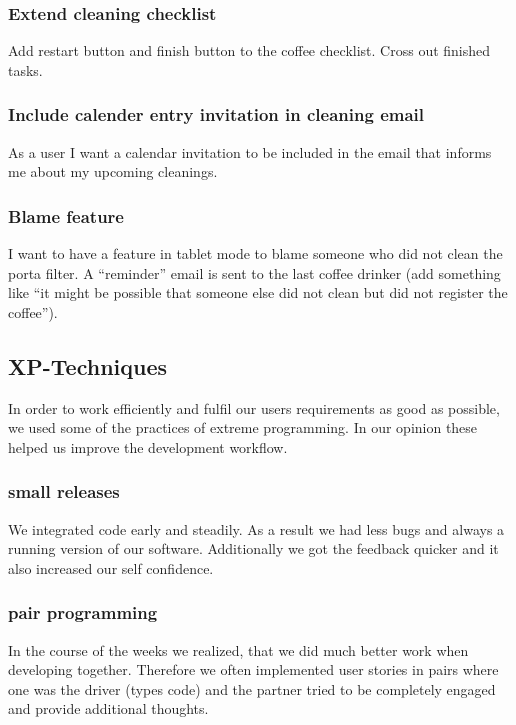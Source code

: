 \subsubsection*{Extend cleaning checklist}

Add restart button and finish button to the coffee checklist. Cross out
finished tasks.

\subsubsection*{Include calender entry invitation in cleaning email}

As a user I want a calendar invitation to be included in the email that
informs me about my upcoming cleanings.

\subsubsection*{Blame feature}

I want to have a feature in tablet mode to blame someone who did not
clean the porta filter. A ``reminder'' email is sent to the last coffee
drinker (add something like ``it might be possible that someone else did
not clean but did not register the coffee'').

\subsection{XP-Techniques}\label{xp-techniques}

In order to work efficiently and fulfil our users requirements as good
as possible, we used some of the practices of extreme programming. In
our opinion these helped us improve the development workflow.

\subsubsection{small releases}\label{small-releases}

We integrated code early and steadily. As a result we had less bugs and
always a running version of our software. Additionally we got the
feedback quicker and it also increased our self confidence.

\subsubsection{pair programming}\label{pair-programming}

In the course of the weeks we realized, that we did much better work
when developing together. Therefore we often implemented user stories in
pairs where one was the driver (types code) and the partner tried to be
completely engaged and provide additional thoughts.

